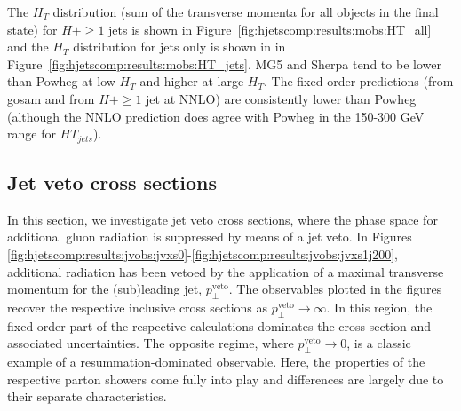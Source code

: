 {The $H_T$ distribution (sum of the transverse momenta for all objects
in the final state) for $H+\ge1$ jets is shown in
Figure~\ref{fig:hjetscomp:results:mobs:HT_all} and the $H_T$
distribution for jets only is shown in in
Figure~\ref{fig:hjetscomp:results:mobs:HT_jets}. 
MG5 and Sherpa tend to be lower than Powheg at low $H_T$ and higher at
large $H_T$. The fixed order predictions (from gosam and from $H+\ge1$
jet at NNLO) are consistently lower than Powheg (although the NNLO
prediction does agree with Powheg in the 150-300 GeV range for
$HT_{jets}$).



\clearpage
\subsection{Jet veto cross sections}
\label{sec:hjetscomp:results:jvobs}


In this section, we investigate jet veto cross sections, where the phase space for
additional gluon radiation is suppressed by means of a jet veto. 
In  Figures 
\ref{fig:hjetscomp:results:jvobs:jvxs0}-\ref{fig:hjetscomp:results:jvobs:jvxs1j200}, 
additional radiation has been vetoed by the application of a maximal transverse 
momentum for the (sub)leading jet, $p_\perp^\text{veto}$. The observables plotted
in the figures recover the respective inclusive cross sections as 
$p_\perp^\text{veto}\to\infty$. In this region, the fixed order 
part of the respective calculations dominates the cross section 
and associated uncertainties. The opposite regime, where $p_\perp^\text{veto}\to 0$, 
is a classic example of a resummation-dominated observable. Here, the 
properties of the respective parton showers come fully into play and 
differences are largely due to their separate characteristics. 

}
